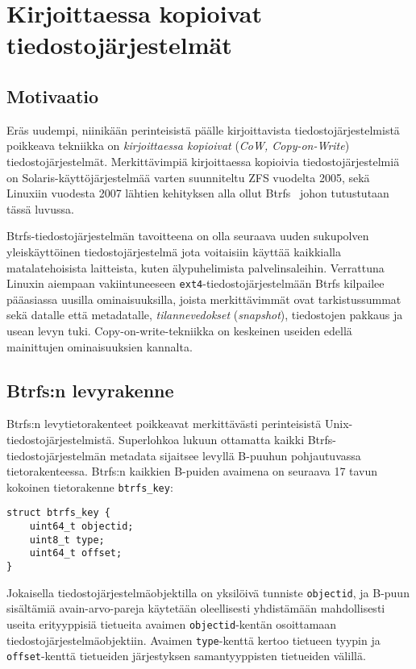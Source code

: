 \section{Kirjoittaessa kopioivat tiedostojärjestelmät}
\label{ChapCopyOnWrite}
\subsection{Motivaatio}
Eräs uudempi, niinikään perinteisistä päälle kirjoittavista tiedostojärjestelmistä poikkeava tekniikka on \emph{kirjoittaessa kopioivat} (\emph{CoW, Copy-on-Write}) tiedostojärjestelmät.
Merkittävimpiä kirjoittaessa kopioivia tiedostojärjestelmiä on Solaris-käyttöjärjestelmää varten suunniteltu ZFS vuodelta 2005,
sekä Linuxiin vuodesta 2007 lähtien kehityksen alla ollut Btrfs~\cite{Btrfs} johon tutustutaan tässä luvussa.

Btrfs-tiedostojärjestelmän tavoitteena on olla seuraava uuden sukupolven yleiskäyttöinen tiedostojärjestelmä jota voitaisiin käyttää kaikkialla matalatehoisista laitteista, kuten älypuhelimista palvelinsaleihin.
Verrattuna Linuxin aiempaan vakiintuneeseen \texttt{ext4}-tiedostojärjestelmään Btrfs kilpailee pääasiassa uusilla ominaisuuksilla,
joista merkittävimmät ovat tarkistussummat sekä datalle että metadatalle, \emph{tilannevedokset} (\emph{snapshot}), tiedostojen pakkaus ja usean levyn tuki.
Copy-on-write-tekniikka on keskeinen useiden edellä mainittujen ominaisuuksien kannalta.

\subsection{Btrfs:n levyrakenne}
Btrfs:n levytietorakenteet poikkeavat merkittävästi perinteisistä Unix-tiedosto\-järjestelmistä.
Superlohkoa lukuun ottamatta kaikki Btrfs-tiedostojärjestelmän metadata sijaitsee levyllä B-puuhun pohjautuvassa tietorakenteessa.
Btrfs:n kaikkien B-puiden avaimena on seuraava 17 tavun kokoinen tietorakenne \texttt{btrfs\_key}:
\begin{verbatim}
struct btrfs_key {
    uint64_t objectid;
    uint8_t type;
    uint64_t offset;
}
\end{verbatim}
Jokaisella tiedostojärjestelmäobjektilla on yksilöivä tunniste \texttt{objectid},
ja B-puun sisältämiä avain-arvo-pareja käytetään oleellisesti yhdistämään mahdollisesti useita erityyppisiä tietueita avaimen \texttt{objectid}-kentän osoittamaan tiedostojärjestelmäobjektiin.
Avaimen \texttt{type}-kenttä kertoo tietueen tyypin ja \texttt{offset}-kenttä tietueiden järjestyksen samantyyppisten tietueiden välillä.

